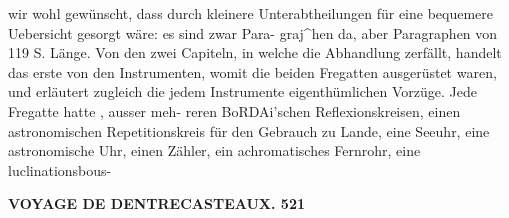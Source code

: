 \documentclass[12pt,a4paper]{article}
\begin{document}
wir  wohl  gewünscht, dass  durch  kleinere  Unterabtheilungen  für  eine  bequemere  Uebersicht  gesorgt  wäre:  es  sind  zwar  Para- graj\textasciicircum{}hen  da,  aber  Paragraphen  von  119  S.  Länge.  Von  den  zwei  Capiteln,  in  welche  die  Abhandlung zerfällt,  handelt  das  erste  von  den  Instrumenten,  womit  die  beiden  Fregatten  ausgerüstet  waren,  und erläutert  zugleich  die  jedem  Instrumente  eigenthümlichen  Vorzüge.  Jede  Fregatte  hatte ,  ausser  meh- reren BoRDAi'schen  Reflexionskreisen,  einen  astronomischen  Repetitionskreis  für  den  Gebrauch  zu  Lande, eine  Seeuhr,  eine  astronomische  Uhr,  einen  Zähler,  ein  achromatisches  Fernrohr,  eine  luclinationsbous-

\vspace{0.5em}


\noindent\textbf{VOYAGE  DE  DENTRECASTEAUX.  521}
\end{document}
